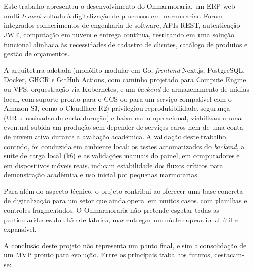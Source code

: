 \chapter*{}
\noindent
{}
\newline
\newline

Este trabalho apresentou o desenvolvimento do Onmarmoraria, um ERP web multi-\textit{tenant} voltado à digitalização de processos em marmorarias. Foram integrados conhecimentos de engenharia de software, APIs REST, autenticação JWT, computação em nuvem e entrega contínua, resultando em uma solução funcional alinhada às necessidades de cadastro de clientes, catálogo de produtos e gestão de orçamentos.

A arquitetura adotada (monólito modular em Go, \textit{frontend} Next.js, PostgreSQL, Docker, GHCR e GitHub Actions, com caminho projetado para Compute Engine ou VPS, orquestração via Kubernetes, e um \textit{backend} de armazenamento de mídias local, com suporte pronto para o GCS ou para um serviço compatível com o Amazon S3, como o Cloudflare R2) privilegiou reprodutibilidade, segurança (URLs assinadas de curta duração) e baixo custo operacional, viabilizando uma eventual subida em produção sem depender de serviços caros nem de uma conta de nuvem ativa durante a avaliação acadêmica. A validação deste trabalho, contudo, foi conduzida em ambiente local: os testes automatizados do \textit{backend}, a suíte de carga local (k6) e as validações manuais do painel, em computadores e em dispositivos móveis reais, indicam estabilidade dos fluxos críticos para demonstração acadêmica e uso inicial por pequenas marmorarias.

Para além do aspecto técnico, o projeto contribui ao oferecer uma base concreta de digitalização para um setor que ainda opera, em muitos casos, com planilhas e controles fragmentados. O Onmarmoraria não pretende esgotar todas as particularidades do chão de fábrica, mas entregar um núcleo operacional útil e expansível.

A conclusão deste projeto não representa um ponto final, e sim a consolidação de um MVP pronto para evolução. Entre os principais trabalhos futuros, destacam-se:

